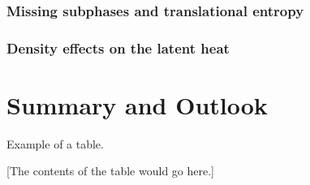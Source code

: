\documentclass[12pt]{report}
\begin{document}
\subsection{Missing subphases and translational entropy}
\subsection{Density effects on the latent heat}

\chapter{Summary and Outlook}











\begin{table}
\caption{Example of a table.}
\centerline{[The contents of the table would go here.]}
\end{table}



\begin{thebibliography}{99}
        
\end{thebibliography}
\end{document}
